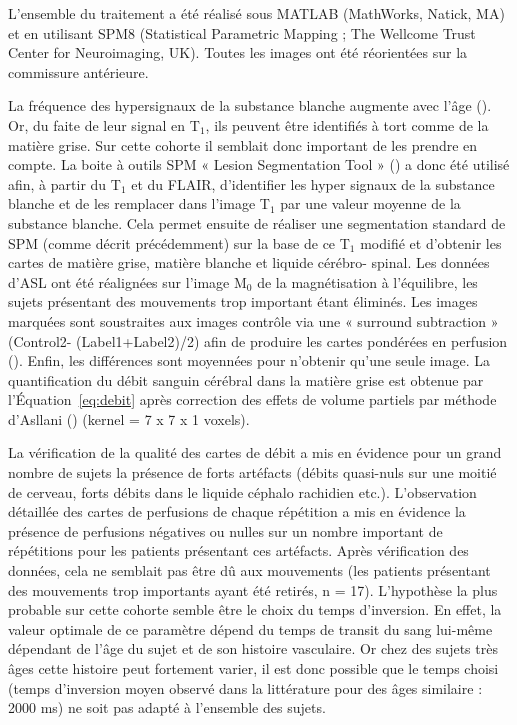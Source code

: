 L’ensemble du traitement a été réalisé sous MATLAB (MathWorks, Natick, MA) et en utilisant
SPM8 (Statistical Parametric Mapping ; The Wellcome Trust Center for Neuroimaging, UK). Toutes les
images ont été réorientées sur la commissure antérieure.

La fréquence des hypersignaux de la substance blanche augmente avec l’âge (\cite{Awad1987}). Or, du faite
de leur signal en T$_1$, ils peuvent être identifiés à tort comme de la matière grise. Sur cette cohorte il
semblait donc important de les prendre en compte. La boite à outils SPM « Lesion Segmentation Tool »
(\cite{Schmidt2012}) a donc été utilisé afin, à partir du T$_1$ et du FLAIR, d’identifier les hyper signaux de la substance
blanche et de les remplacer dans l’image T$_1$ par une valeur moyenne de la substance blanche. Cela
permet ensuite de réaliser une segmentation standard de SPM (comme décrit précédemment) sur la
base de ce T$_1$ modifié et d’obtenir les cartes de matière grise, matière blanche et liquide cérébro-
spinal. Les données d’ASL ont été réalignées sur l’image M$_0$ de la magnétisation à l’équilibre, les sujets
présentant des mouvements trop important étant éliminés. Les images marquées sont soustraites aux
images contrôle via une « surround subtraction » (Control2- (Label1+Label2)/2) afin de produire les
cartes pondérées en perfusion (\cite{Wang2008}). Enfin, les différences sont moyennées pour n’obtenir qu’une
seule image. La quantification du débit sanguin cérébral dans la matière grise est obtenue par
l’Équation~\ref{eq:debit} après correction des effets de volume partiels par méthode d’Asllani (\cite{Asllani2008}) (kernel = 7 x
7 x 1 voxels).

La vérification de la qualité des cartes de débit a mis en évidence pour un grand nombre de
sujets la présence de forts artéfacts (débits quasi-nuls sur une moitié de cerveau, forts débits dans le
liquide céphalo rachidien etc.). L’observation détaillée des cartes de perfusions de chaque répétition
a mis en évidence la présence de perfusions négatives ou nulles sur un nombre important de
répétitions pour les patients présentant ces artéfacts. Après vérification des données, cela ne semblait
pas être dû aux mouvements (les patients présentant des mouvements trop importants ayant été
retirés, n = 17). L’hypothèse la plus probable sur cette cohorte semble être le choix du temps
d’inversion. En effet, la valeur optimale de ce paramètre dépend du temps de transit du sang lui-même
dépendant de l’âge du sujet et de son histoire vasculaire. Or chez des sujets très âges cette histoire
peut fortement varier, il est donc possible que le temps choisi (temps d’inversion moyen observé dans
la littérature pour des âges similaire : 2000 ms) ne soit pas adapté à l’ensemble des sujets.

